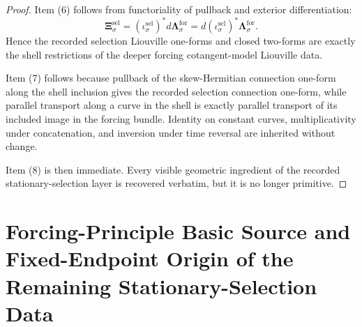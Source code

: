 \documentclass[11pt]{article}
\newcommand{\SelInc}[1]{\iota_{#1}^{\mathrm{sel}}}
\newcommand{\SelTwo}[1]{\boldsymbol{\Xi}_{#1}^{\mathrm{sel}}}
\newcommand{\ForLiouville}[1]{\boldsymbol{\Lambda}_{#1}^{\mathrm{for}}}
\begin{document}
\begin{proof}
Item (6) follows from functoriality of pullback and exterior differentiation:
\[
\SelTwo{\sigma}
=
(\SelInc{\sigma})^*d\ForLiouville{\sigma}
=
d(\SelInc{\sigma})^*\ForLiouville{\sigma}.
\]
Hence the recorded selection Liouville one-forms and closed two-forms are exactly the shell restrictions of the deeper forcing cotangent-model Liouville data.

Item (7) follows because pullback of the skew-Hermitian connection one-form along the shell inclusion gives the recorded selection connection one-form, while parallel transport along a curve in the shell is exactly parallel transport of its included image in the forcing bundle. Identity on constant curves, multiplicativity under concatenation, and inversion under time reversal are inherited without change.

Item (8) is then immediate. Every visible geometric ingredient of the recorded stationary-selection layer is recovered verbatim, but it is no longer primitive.
\end{proof}

\section{Forcing-Principle Basic Source and Fixed-Endpoint Origin of the Remaining Stationary-Selection Data}
\end{document}
